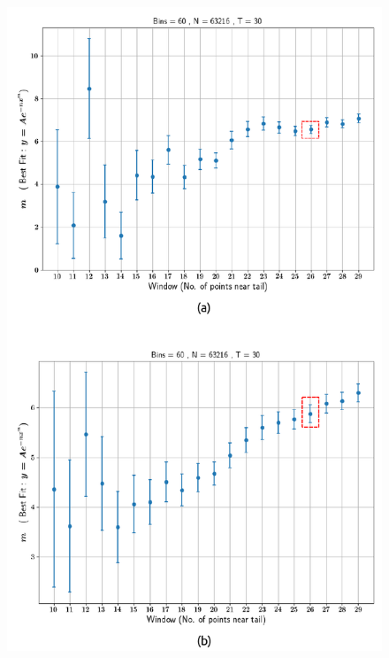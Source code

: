 




\begin{figure}
\centering
	\includegraphics{plots/drop_stats/determine_fit_linear.pdf}
	\caption{\blindtext}
\label{determine_linear}
\end{figure}



